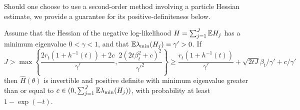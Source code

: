 Should one choose to use a second-order method involving a particle Hessian estimate, we provide a guarantee for its positive-definiteness below.

\begin{lem}
    \label{lemma:hess_bound}
    Assume that the Hessian of the negative log-likelihood $H=\sum_{j=1}^J \mathbb{E} H_j$ has a minimum eigenvalue $0<\gamma<1$, and that $\mathbb{E} \lambda_{\min} (H_j) = \gamma' > 0$. 
    If 
    \begin{equation}
        J > \max\left\{\frac{2r_t(1+h^{-1}(t)) + 2c}{\gamma'}, \frac{2(2t\beta_t^2+c)^2}{\gamma'^2}\right\} \geq  \frac{r_t(1+h^{-1}(t))}{\gamma'} + \sqrt{2tJ}\beta_t/\gamma' + c/\gamma'
    \end{equation}    
    then $\hat{H}(\theta)$ is invertible and positive definite with minimum eigenvalue greater than or equal to $c \in (0, \sum_{j=1}^J \mathbb{E}\lambda_{\min}(H_j))$, with probability at least $1-\exp(-t)$.
\end{lem}
